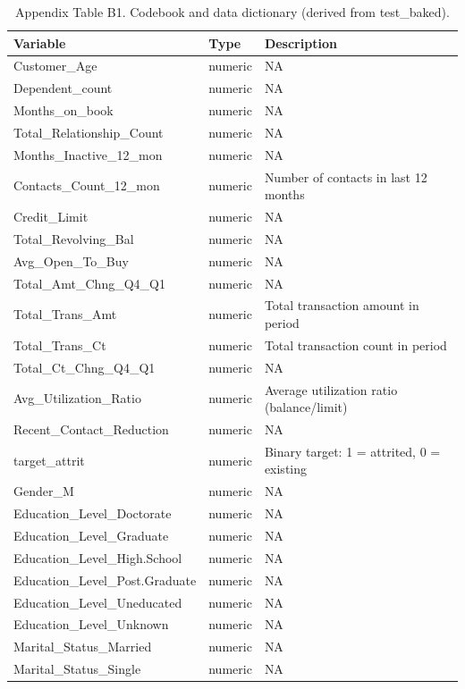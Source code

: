 \documentclass[
  12pt,
]{article}
\begin{document}
\begin{table}[!h]
\centering
\caption{\label{tab:appendix-b1}Appendix Table B1. Codebook and data dictionary (derived from test_baked).}
\centering
\begin{tabular}[t]{l|l|l}
\hline
Variable & Type & Description\\
\hline
Customer\_Age & numeric & NA\\
\hline
Dependent\_count & numeric & NA\\
\hline
Months\_on\_book & numeric & NA\\
\hline
Total\_Relationship\_Count & numeric & NA\\
\hline
Months\_Inactive\_12\_mon & numeric & NA\\
\hline
Contacts\_Count\_12\_mon & numeric & Number of contacts in last 12 months\\
\hline
Credit\_Limit & numeric & NA\\
\hline
Total\_Revolving\_Bal & numeric & NA\\
\hline
Avg\_Open\_To\_Buy & numeric & NA\\
\hline
Total\_Amt\_Chng\_Q4\_Q1 & numeric & NA\\
\hline
Total\_Trans\_Amt & numeric & Total transaction amount in period\\
\hline
Total\_Trans\_Ct & numeric & Total transaction count in period\\
\hline
Total\_Ct\_Chng\_Q4\_Q1 & numeric & NA\\
\hline
Avg\_Utilization\_Ratio & numeric & Average utilization ratio (balance/limit)\\
\hline
Recent\_Contact\_Reduction & numeric & NA\\
\hline
target\_attrit & numeric & Binary target: 1 = attrited, 0 = existing\\
\hline
Gender\_M & numeric & NA\\
\hline
Education\_Level\_Doctorate & numeric & NA\\
\hline
Education\_Level\_Graduate & numeric & NA\\
\hline
Education\_Level\_High.School & numeric & NA\\
\hline
Education\_Level\_Post.Graduate & numeric & NA\\
\hline
Education\_Level\_Uneducated & numeric & NA\\
\hline
Education\_Level\_Unknown & numeric & NA\\
\hline
Marital\_Status\_Married & numeric & NA\\
\hline
Marital\_Status\_Single & numeric & NA\\

\end{tabular}
\end{table}
\end{document}

